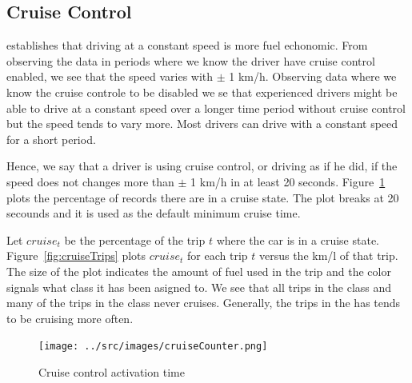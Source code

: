 \subsection{Cruise Control}

\cite{EcoMark} establishes that driving at a constant speed is more fuel echonomic. 
From observing the data in periods where we know the driver have cruise control enabled, we see that the speed varies with $\pm$ 1 km/h. Observing data where we know the cruise controle to be disabled we se that experienced drivers might be able to drive at a constant speed over a longer time period without cruise control but the speed tends to vary more. 
Most drivers can drive with a constant speed for a short period. 

Hence, we say that a driver is using cruise control, or driving as if he did, if the speed does not changes more than $\pm$ 1 km/h in at least 20 seconds. Figure~\ref{fig:cruiseTripsTime} plots the percentage of records there are in a cruise state. The plot breaks at 20 secounds and it is used as the default minimum cruise time.

Let $cruise_t$ be the percentage of the trip $t$ where the car is in a cruise state.
Figure~\ref{fig:cruiseTrips} plots $cruise_t$ for each trip $t$ versus the km/l of that trip.
The size of the plot indicates the amount of fuel used in the trip and the color signals what class it has been asigned to. 
We see that all trips in the \fuelLow class and many of the trips in the \fuelMedium class never cruises.
Generally, the trips in the \fuelHigh has tends to be cruising more often.

\begin{figure}
\centering
\texttt{[image: ../src/images/cruiseCounter.png]}
\caption{Cruise control activation time}
\label{fig:cruiseTripsTime}
\end{figure}

